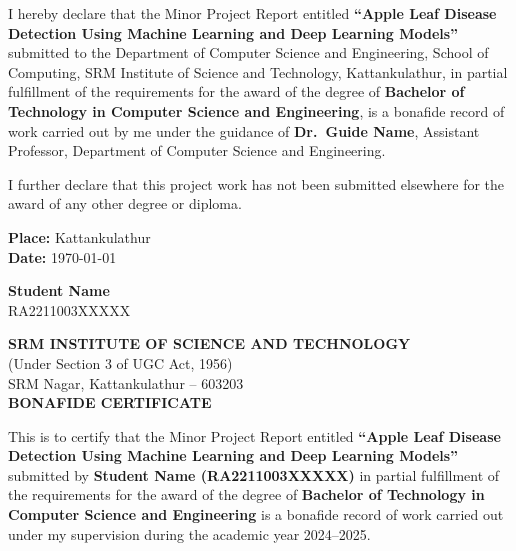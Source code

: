 \documentclass[12pt]{report}
\begin{document}
I hereby declare that the Minor Project Report entitled \textbf{``Apple Leaf Disease Detection Using Machine Learning and Deep Learning Models''} submitted to the Department of Computer Science and Engineering, School of Computing, SRM Institute of Science and Technology, Kattankulathur, in partial fulfillment of the requirements for the award of the degree of \textbf{Bachelor of Technology in Computer Science and Engineering}, is a bonafide record of work carried out by me under the guidance of \textbf{Dr.\ Guide Name}, Assistant Professor, Department of Computer Science and Engineering.

\vspace{0.5cm}

I further declare that this project work has not been submitted elsewhere for the award of any other degree or diploma.

\vspace{2cm}

\begin{flushleft}
\textbf{Place:} Kattankulathur\\
\textbf{Date:} \today
\end{flushleft}

\vspace{1.5cm}

\begin{flushright}
\textbf{Student Name}\\
RA2211003XXXXX
\end{flushright}

\newpage
\thispagestyle{fancy}
\begin{center}
\textbf{\large SRM INSTITUTE OF SCIENCE AND TECHNOLOGY}\\
(Under Section 3 of UGC Act, 1956)\\[0.2cm]
SRM Nagar, Kattankulathur -- 603203\\[0.5cm]

\textbf{\large BONAFIDE CERTIFICATE}
\end{center}
\vspace{1cm}

This is to certify that the Minor Project Report entitled \textbf{``Apple Leaf Disease Detection Using Machine Learning and Deep Learning Models''} submitted by \textbf{Student Name (RA2211003XXXXX)} in partial fulfillment of the requirements for the award of the degree of \textbf{Bachelor of Technology in Computer Science and Engineering} is a bonafide record of work carried out under my supervision during the academic year 2024--2025.
\end{document}
